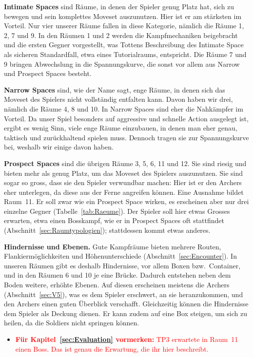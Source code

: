 \documentclass[../Main.tex]{subfiles}
\begin{document}
\textbf{Intimate Spaces} sind Räume, in denen der Spieler genug Platz hat, sich zu bewegen und sein komplettes Moveset auszunutzen. Hier ist er am stärksten im Vorteil. Nur vier unserer Räume fallen in diese Kategorie, nämlich die Räume 1, 2, 7 und 9. In den Räumen 1 und 2 werden die Kampfmechaniken beigebracht und die ersten Gegner vorgestellt, was Tottens Beschreibung des Intimate Space als sicheren Standardfall, etwa eines Tutorialraums, entspricht. Die Räume 7 und 9 bringen Abwechslung in die Spannungskurve, die sonst vor allem aus Narrow und Prospect Spaces besteht.

\textbf{Narrow Spaces} sind, wie der Name sagt, enge Räume, in denen sich das Moveset des Spielers nicht vollständig entfalten kann. Davon haben wir drei, nämlich die Räume 4, 8 und 10. In Narrow Spaces sind eher die Nahkämpfer im Vorteil. Da unser Spiel besonders auf aggressive und schnelle Action ausgelegt ist, ergibt es wenig Sinn, viele enge Räume einzubauen, in denen man eher genau, taktisch und zurückhaltend spielen muss. Dennoch tragen sie zur Spannungskurve bei, weshalb wir einige davon haben.

\textbf{Prospect Spaces} sind die übrigen Räume 3, 5, 6, 11 und 12. Sie sind riesig und bieten mehr als genug Platz, um das Moveset des Spielers auszunutzen. Sie sind sogar so gross, dass sie den Spieler verwundbar machen: Hier ist er den Archers eher unterlegen, da diese aus der Ferne angreifen können. Eine Ausnahme bildet Raum~11. Er soll zwar wie ein Prospect Space wirken, es erscheinen aber nur drei einzelne Gegner (Tabelle~\ref{tab:Raeume}). Der Spieler soll hier etwas Grosses erwarten, etwa einen Bosskampf, wie er in Prospect Spaces oft stattfindet (Abschnitt~\ref{sec:Raumtypologien}); stattdessen kommt etwas anderes.

\textbf{Hindernisse und Ebenen.} Gute Kampfräume bieten mehrere Routen, Flankiermöglichkeiten und Höhenunterschiede (Abschnitt~\ref{sec:Encounter}). In unseren Räumen gibt es deshalb Hindernisse, vor allem Boxen bzw.\ Container, und in den Räumen 6 und 10 je eine Brücke. Dadurch entstehen neben dem Boden weitere, erhöhte Ebenen. Auf diesen erscheinen meistens die Archers (Abschnitt~\ref{sec:V5}), was es dem Spieler erschwert, an sie heranzukommen, und den Archers einen guten Überblick verschafft. Gleichzeitig können die Hindernisse dem Spieler als Deckung dienen. Er kann zudem auf eine Box steigen, um sich zu heilen, da die Soldiers nicht springen können.

\begin{itemize}[leftmargin=1.5cm]
    \item \textcolor{red}{\textbf{Für Kapitel~\ref{sec:Evaluation} vormerken:} TP3 erwartete in Raum~11 einen Boss. Das ist genau die Erwartung, die ihr hier beschreibt.}
\end{itemize}
\end{document}
